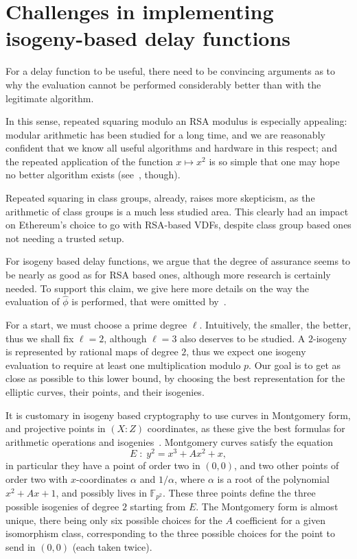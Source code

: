\documentclass{llncs}
\newcommand{\F}{\mathbb{F}}
\begin{document}
\section{Challenges in implementing isogeny-based delay functions}
\label{sec:secure-impl-isog}

For a delay function to be useful, there need to be convincing
arguments as to why the evaluation cannot be performed considerably
better than with the legitimate algorithm.

In this sense, repeated squaring modulo an RSA modulus is especially
appealing: modular arithmetic has been studied for a long time, and we
are reasonably confident that we know all useful algorithms and
hardware in this respect; and the repeated application of the function
$x\mapsto x^2$ is so simple that one may hope no better algorithm
exists (see~\cite{BernsteinSorenson07}, though).

Repeated squaring in class groups, already, raises more skepticism, as
the arithmetic of class groups is a much less studied area. %
This clearly had an impact on Ethereum's choice to go with RSA-based
VDFs, despite class group based ones not needing a trusted setup.

For isogeny based delay functions, we argue that the degree of
assurance seems to be nearly as good as for RSA based ones, although
more research is certainly needed. %
To support this claim, we give here more details on the way the
evaluation of $\hat\phi$ is performed, that were omitted
by~\cite{10.1007/978-3-030-34578-5_10}.

For a start, we must choose a prime degree $\ell$. %
Intuitively, the smaller, the better, thus we shall fix $\ell=2$,
although $\ell=3$ also deserves to be studied. %
A $2$-isogeny is represented by rational maps of degree $2$, thus we
expect one isogeny evaluation to require at least one multiplication
modulo $p$. %
Our goal is to get as close as possible to this lower bound, by
choosing the best representation for the elliptic curves, their
points, and their isogenies.

It is customary in isogeny based cryptography to use curves in
Montgomery form, and projective points in $(X:Z)$ coordinates, as
these give the best formulas for arithmetic operations and
isogenies~\cite{costello2016sidh,10.1007/978-3-319-79063-3_11}. %
Montgomery curves satisfy the equation
\[E \;:\; y^2 = x^3 + Ax^2 + x,\] %
in particular they have a point of order two in $(0,0)$, and two other
points of order two with $x$-coordinates $\alpha$ and $1/\alpha$,
where $\alpha$ is a root of the polynomial $x^2+Ax+1$, and possibly
lives in $\F_{p^2}$. %
These three points define the three possible isogenies of degree $2$
starting from $E$. %
The Montgomery form is almost unique, there being only six possible
choices for the $A$ coefficient for a given isomorphism class,
corresponding to the three possible choices for the point to send in
$(0,0)$ (each taken twice).
\end{document}
